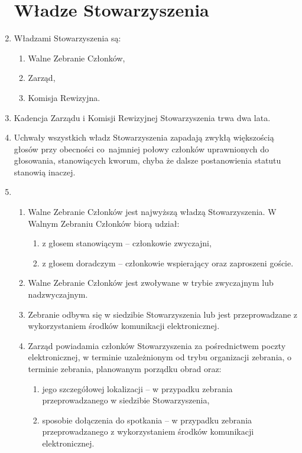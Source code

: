 \documentclass[chapterprefix,notitlepage]{article}
\begin{document}
\begin{enumerate}
\section{Władze Stowarzyszenia}

	\item Władzami Stowarzyszenia są:
	\begin{enumerate}[1)]
		\item Walne Zebranie Członków,
		\item Zarząd,
		\item Komisja Rewizyjna.
	\end{enumerate}
	
	\item Kadencja Zarządu i Komisji Rewizyjnej Stowarzyszenia trwa dwa lata.
	
	\item Uchwały wszystkich władz Stowarzyszenia zapadają zwykłą większością głosów przy obecności co~najmniej połowy członków uprawnionych do głosowania, stanowiących kworum, chyba że dalsze postanowienia statutu stanowią inaczej.
	
	\item \begin{enumerate}
		\item Walne Zebranie Członków jest najwyższą władzą Stowarzyszenia. W Walnym Zebraniu Członków biorą udział:
		\begin{enumerate}
			\item z głosem stanowiącym – członkowie zwyczajni,
			\item z głosem doradczym – członkowie wspierający oraz zaproszeni goście.
		\end{enumerate}
		\item Walne Zebranie Członków jest zwoływane w trybie zwyczajnym lub nadzwyczajnym.
		\item Zebranie odbywa się w siedzibie Stowarzyszenia lub jest przeprowadzane z wykorzystaniem środków komunikacji elektronicznej.
		\item Zarząd powiadamia członków Stowarzyszenia za pośrednictwem poczty elektronicznej, w terminie uzależnionym od trybu organizacji zebrania, o terminie zebrania, planowanym porządku obrad oraz:
				\begin{enumerate}
					\item jego szczegółowej lokalizacji – w przypadku zebrania przeprowadzanego w siedzibie Stowarzyszenia,
					\item sposobie dołączenia do spotkania – w przypadku zebrania przeprowadzanego z wykorzystaniem środków komunikacji elektronicznej.
				\end{enumerate}
	\end{enumerate}
	

\end{enumerate}
\end{document}
